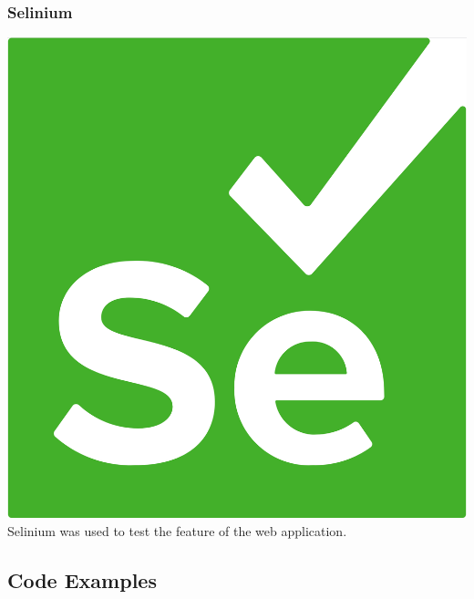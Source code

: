 \subsubsection{Selinium}
\includegraphics[scale=0.015]{./img/Testing.PNG}
Selinium was used to test the feature of the web application.

\subsection{Code Examples}




